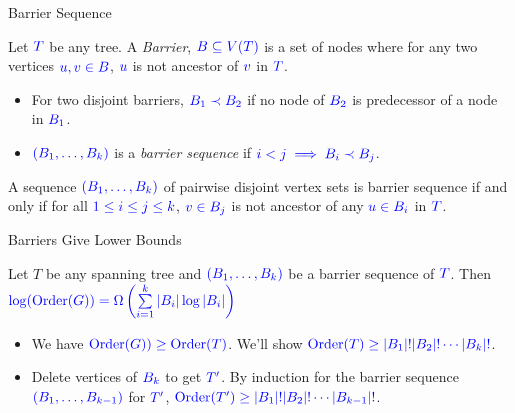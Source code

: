 \documentclass[10pt, handout]{beamer}
\DeclareMathOperator{\order}{Order}
\begin{document}
\begin{frame}{Barrier Sequence}
	\begin{definition}[Barrier]
		Let $\mathcolor{blue}{T}$ be any tree. A \emph{Barrier}, $\mathcolor{blue}{B\subseteq V(T)}$ is a set of nodes where for any two vertices $\mathcolor{blue}{u,v\in B}$, $\mathcolor{blue}{u}$ is not ancestor of $\mathcolor{blue}{v}$ in $\mathcolor{blue}{T}$.
	\end{definition}
	\pause
	\begin{itemize}
		\item For two disjoint barriers, $\mathcolor{blue}{B_1\prec B_2}$ if no node of $\mathcolor{blue}{B_2}$ is predecessor of a node in $\mathcolor{blue}{B_1}$.\pause
		\item $\mathcolor{blue}{(B_1,\dots, B_k)}$ is a \emph{barrier sequence} if  $\mathcolor{blue}{i<j\implies B_i\prec B_j}$.\pause
	\end{itemize}
	\vfill

	\begin{lemma}
		A sequence $\mathcolor{blue}{(B_1,\dots, B_k)}$ of pairwise disjoint vertex sets is barrier sequence if and only if for all $\mathcolor{blue}{1\leq i\leq j\leq k}$, $\mathcolor{blue}{v\in B_j}$ is not ancestor of any $\mathcolor{blue}{u\in B_i}$ in $\mathcolor{blue}{T}$.
	\end{lemma}
\end{frame}

\begin{frame}{Barriers Give Lower Bounds}
	\begin{lemma}
		Let $T$ be any spanning tree and $\mathcolor{blue}{(B_1,\dots, B_k)}$ be a barrier sequence of $\mathcolor{blue}{T}$. Then $\mathcolor{blue}{\log(\order(G))=\Omega\left(\sum\limits_{i=1}^k|B_i|\log|B_i|\right)}$
	\end{lemma}\vfill \pause

	\begin{itemize}
		\item We have $\mathcolor{blue}{\order(G))\geq \order(T)}$. We'll show $\mathcolor{blue}{\order(T)\geq |B_1|!|B_2|!\cdots|B_k|!}$.\pause \vfill
		\item Delete vertices of $\mathcolor{blue}{B_k}$ to get $\mathcolor{blue}{T'}$. By induction for the barrier sequence $\mathcolor{blue}{(B_1,\dots, B_{k-1})}$ for $\mathcolor{blue}{T'}$, $\mathcolor{blue}{\order(T')\geq |B_1|!|B_2|!\cdots|B_{k-1}|!}$.
	\end{itemize}
\end{frame}
\end{document}
